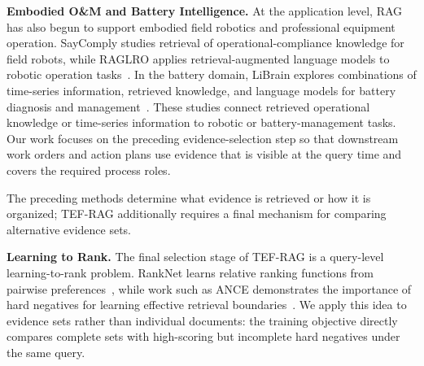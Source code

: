 \textbf{Embodied O\&M and Battery Intelligence.}
At the application level, RAG has also begun to support embodied field robotics and professional equipment operation. SayComply studies retrieval of operational-compliance knowledge for field robots, while RAGLRO applies retrieval-augmented language models to robotic operation tasks~\cite{ginting2025saycomply,wang2026raglro}. In the battery domain, LiBrain explores combinations of time-series information, retrieved knowledge, and language models for battery diagnosis and management~\cite{li2026librain}. These studies connect retrieved operational knowledge or time-series information to robotic or battery-management tasks. Our work focuses on the preceding evidence-selection step so that downstream work orders and action plans use evidence that is visible at the query time and covers the required process roles.

The preceding methods determine what evidence is retrieved or how it is organized; TEF-RAG additionally requires a final mechanism for comparing alternative evidence sets. 

\textbf{Learning to Rank.}
The final selection stage of TEF-RAG is a query-level learning-to-rank problem. RankNet learns relative ranking functions from pairwise preferences~\cite{burges2005ranknet}, while work such as ANCE demonstrates the importance of hard negatives for learning effective retrieval boundaries~\cite{xiong2021ance}. We apply this idea to evidence sets rather than individual documents: the training objective directly compares complete sets with high-scoring but incomplete hard negatives under the same query.
